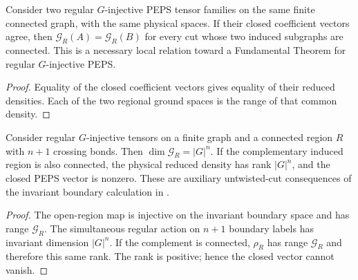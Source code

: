 \begin{lemma}%
    \label{thm:peps_same_state_regular_region_spaces}
    \leanok
    Consider two regular $G$-injective PEPS tensor families on the same
    finite connected graph, with the same physical spaces. If their
    closed coefficient vectors agree, then
    $\mathcal G_R(A)=\mathcal G_R(B)$ for every cut whose two induced
    subgraphs are connected.
    This is a necessary local relation toward a Fundamental Theorem
    for regular $G$-injective PEPS.
\end{lemma}

\begin{proof}\leanok
    Equality of the closed coefficient vectors gives equality of their
    reduced densities. Each of the two regional ground spaces is the
    range of that common density.
\end{proof}

\begin{lemma}%
    \label{thm:peps_regular_region_dimension}
    \leanok
    Consider regular $G$-injective tensors on a finite graph and a
    connected region $R$ with $n+1$ crossing bonds. Then
    $\dim\mathcal G_R=|G|^n$. If the complementary induced region is
    also connected, the physical reduced density has rank $|G|^n$,
    and the closed PEPS vector is nonzero.
    These are auxiliary untwisted-cut consequences of the invariant
    boundary calculation in \cite[Corollary~6.10]{Schuch2010PEPS}.
\end{lemma}

\begin{proof}\leanok
    The open-region map is injective on the invariant boundary space
    and has range $\mathcal G_R$. The simultaneous regular action on
    $n+1$ boundary labels has invariant dimension $|G|^n$. If the
    complement is connected, $\rho_R$ has range $\mathcal G_R$ and
    therefore this same rank. The rank is positive; hence the closed
    vector cannot vanish.
\end{proof}

